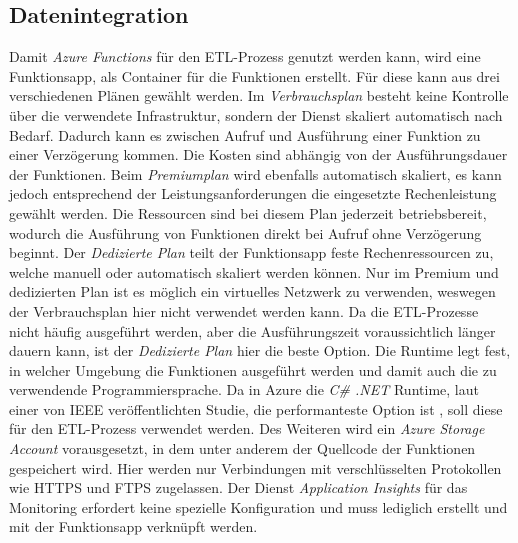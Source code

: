\subsection{Datenintegration} \label{subsec:infra:konfig:functions}
Damit \textit{Azure Functions} für den ETL-Prozess genutzt werden kann, wird eine Funktionsapp, als Container für die Funktionen erstellt. Für diese kann aus drei verschiedenen Plänen gewählt werden. Im \textit{Verbrauchsplan} besteht keine Kontrolle über die verwendete Infrastruktur, sondern der Dienst skaliert automatisch nach Bedarf. Dadurch kann es zwischen Aufruf und Ausführung einer Funktion zu einer Verzögerung kommen. Die Kosten sind abhängig von der Ausführungsdauer der Funktionen. Beim \textit{Premiumplan} wird ebenfalls automatisch skaliert, es kann jedoch entsprechend der Leistungsanforderungen die eingesetzte Rechenleistung gewählt werden. Die Ressourcen sind bei diesem Plan jederzeit betriebsbereit, wodurch die Ausführung von Funktionen direkt bei Aufruf ohne Verzögerung beginnt. Der \textit{Dedizierte Plan} teilt der Funktionsapp feste Rechenressourcen zu, welche manuell oder automatisch skaliert werden können. Nur im Premium und dedizierten Plan ist es möglich ein virtuelles Netzwerk zu verwenden, weswegen der Verbrauchsplan hier nicht verwendet werden kann. Da die ETL-Prozesse nicht häufig ausgeführt werden, aber die Ausführungszeit voraussichtlich länger dauern kann, ist der \textit{Dedizierte Plan} hier die beste Option. Die Runtime legt fest, in welcher Umgebung die Funktionen ausgeführt werden und damit auch die zu verwendende Programmiersprache. Da in Azure die \textit{C\# .NET} Runtime, laut einer von IEEE veröffentlichten Studie, die performanteste Option ist \cite{jackson_investigation_2018}, soll diese für den ETL-Prozess verwendet werden. Des Weiteren wird ein \textit{Azure Storage Account} vorausgesetzt, in dem unter anderem der Quellcode der Funktionen gespeichert wird. Hier werden nur Verbindungen mit verschlüsselten Protokollen wie HTTPS und FTPS zugelassen. Der Dienst \textit{Application Insights} für das Monitoring erfordert keine spezielle Konfiguration und muss lediglich erstellt und mit der Funktionsapp verknüpft werden. \cite[vgl.][]{satapathi_hands-azure_2021}

